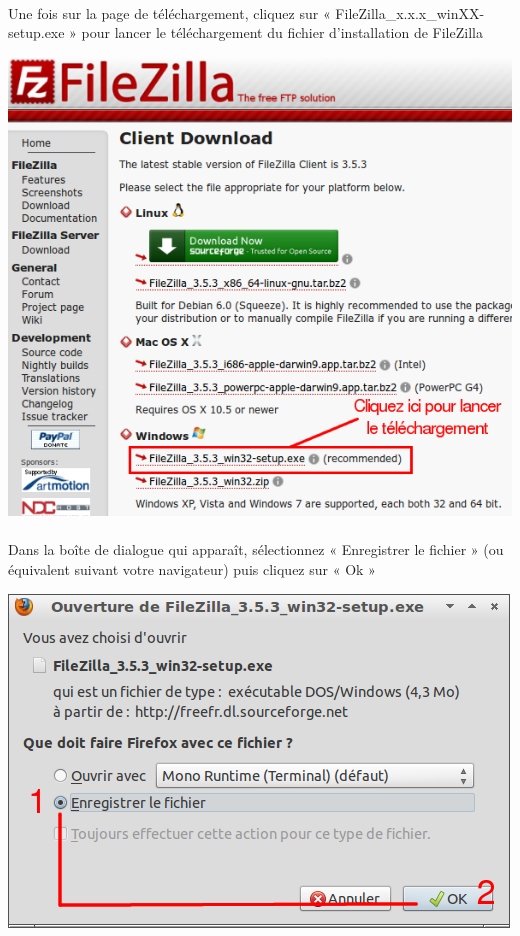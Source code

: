 \documentclass[10pt,a4paper]{article}
\begin{document}
\paragraph{}Une fois sur la page de téléchargement, cliquez sur « FileZilla\_x.x.x\_winXX-setup.exe » pour lancer le téléchargement du fichier d'installation de FileZilla
\begin{center}
\includegraphics[scale=0.4]{img/0013.png}
\end{center}
\paragraph{}Dans la boîte de dialogue qui apparaît, sélectionnez « Enregistrer le fichier » (ou équivalent suivant votre navigateur) puis cliquez sur « Ok »
\begin{center}
\includegraphics[scale=0.5]{img/0014.png}
\end{center}
\end{document}
